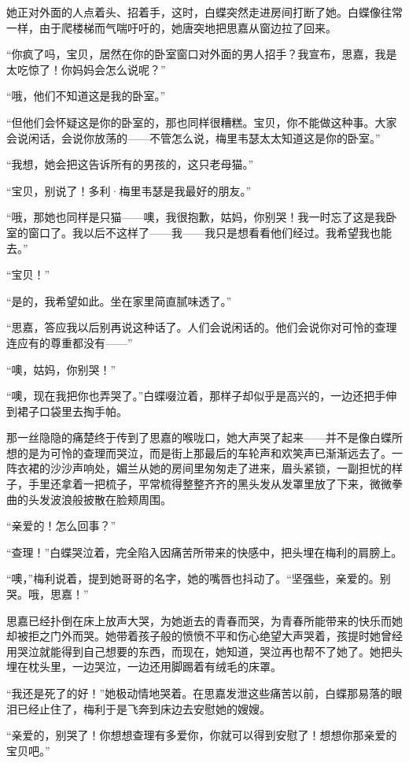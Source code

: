 \par 她正对外面的人点着头、招着手，这时，白蝶突然走进房间打断了她。白蝶像往常一样，由于爬楼梯而气喘吁吁的，她唐突地把思嘉从窗边拉了回来。
\par “你疯了吗，宝贝，居然在你的卧室窗口对外面的男人招手？我宣布，思嘉，我是太吃惊了！你妈妈会怎么说呢？”
\par “哦，他们不知道这是我的卧室。”
\par “但他们会怀疑这是你的卧室的，那也同样很糟糕。宝贝，你不能做这种事。大家会说闲话，会说你放荡的——不管怎么说，梅里韦瑟太太知道这是你的卧室。”
\par “我想，她会把这告诉所有的男孩的，这只老母猫。”
\par “宝贝，别说了！多利·梅里韦瑟是我最好的朋友。”
\par “哦，那她也同样是只猫——噢，我很抱歉，姑妈，你别哭！我一时忘了这是我卧室的窗口了。我以后不这样了——我——我只是想看看他们经过。我希望我也能去。”
\par “宝贝！”
\par “是的，我希望如此。坐在家里简直腻味透了。”
\par “思嘉，答应我以后别再说这种话了。人们会说闲话的。他们会说你对可怜的查理连应有的尊重都没有——”
\par “噢，姑妈，你别哭！”
\par “噢，现在我把你也弄哭了。”白蝶啜泣着，那样子却似乎是高兴的，一边还把手伸到裙子口袋里去掏手帕。
\par 那一丝隐隐的痛楚终于传到了思嘉的喉咙口，她大声哭了起来——并不是像白蝶所想的是为可怜的查理而哭泣，而是街上那最后的车轮声和欢笑声已渐渐远去了。一阵衣裙的沙沙声响处，媚兰从她的房间里匆匆走了进来，眉头紧锁，一副担忧的样子，手里还拿着一把梳子，平常梳得整整齐齐的黑头发从发罩里放了下来，微微拳曲的头发波浪般披散在脸颊周围。
\par “亲爱的！怎么回事？”
\par “查理！”白蝶哭泣着，完全陷入因痛苦所带来的快感中，把头埋在梅利的肩膀上。
\par “噢，”梅利说着，提到她哥哥的名字，她的嘴唇也抖动了。“坚强些，亲爱的。别哭。哦，思嘉！”
\par 思嘉已经扑倒在床上放声大哭，为她逝去的青春而哭，为青春所能带来的快乐而她却被拒之门外而哭。她带着孩子般的愤愤不平和伤心绝望大声哭着，孩提时她曾经用哭泣就能得到自己想要的东西，而现在，她知道，哭泣再也帮不了她了。她把头埋在枕头里，一边哭泣，一边还用脚踢着有绒毛的床罩。
\par “我还是死了的好！”她极动情地哭着。在思嘉发泄这些痛苦以前，白蝶那易落的眼泪已经止住了，梅利于是飞奔到床边去安慰她的嫂嫂。
\par “亲爱的，别哭了！你想想查理有多爱你，你就可以得到安慰了！想想你那亲爱的宝贝吧。”
